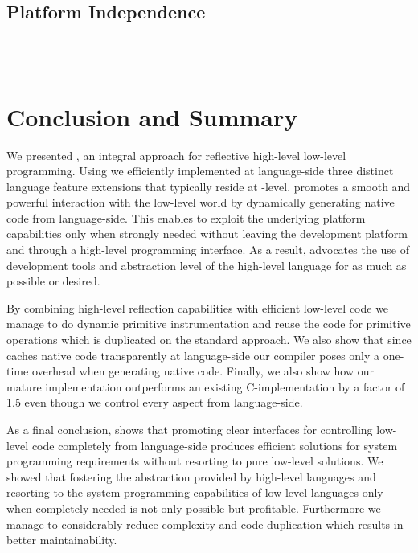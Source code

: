 \subsection{Platform Independence}
 \\
 \\


\section{Conclusion and Summary}
We presented \B, an integral approach for reflective high-level low-level programming.
Using \B we efficiently implemented at language-side three distinct language feature extensions that typically reside at \VM-level.
\B promotes a smooth and powerful interaction with the low-level world by dynamically generating native code from language-side.
This enables to exploit the underlying platform capabilities only when strongly needed without leaving the development platform and through a high-level programming interface. 
As a result, \B advocates the use of development tools and abstraction level of the high-level language for as much as possible or desired.

By combining high-level reflection capabilities with efficient low-level code we manage to do dynamic primitive instrumentation and reuse the code for primitive operations which is duplicated on the standard \JIT approach.
We also show that since \B caches native code transparently at language-side our \JIT compiler poses only a one-time overhead when generating native code. 
Finally, we also show how our mature \FFI implementation outperforms an existing C-\FFI implementation by a factor of 1.5 even though we control every aspect from language-side.


As a final conclusion, \B shows that promoting clear interfaces for controlling low-level code completely from language-side produces efficient solutions for system programming requirements without resorting to pure low-level solutions.
We showed that fostering the abstraction provided by high-level languages and resorting to the system programming capabilities of low-level languages only when completely needed is not only possible but profitable.
Furthermore we manage to considerably reduce complexity and code duplication which results in better maintainability.



